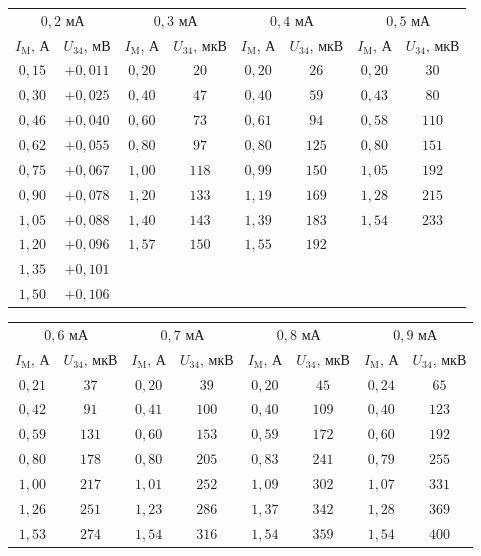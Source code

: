 \begin{center}\small
\begin{tabular}{cccccccc}\hline
\multicolumn{2}{c}{$0{,}2$ мА} & \multicolumn{2}{c}{$0{,}3$ мА} & \multicolumn{2}{c}{$0{,}4$ мА} & \multicolumn{2}{c}{$0{,}5$ мА}\\
$I_{\mathrm M}$, А & $U_{34}$, мВ & $I_{\mathrm M}$, А & $U_{34}$, мкВ & $I_{\mathrm M}$, А & $U_{34}$, мкВ & $I_{\mathrm M}$, А & $U_{34}$, мкВ\\\hline
$0{,}15$ & $+0{,}011$ & $0{,}20$ & $20$ & $0{,}20$ & $26$ & $0{,}20$ & $30$\\
$0{,}30$ & $+0{,}025$ & $0{,}40$ & $47$ & $0{,}40$ & $59$ & $0{,}43$ & $80$\\
$0{,}46$ & $+0{,}040$ & $0{,}60$ & $73$ & $0{,}61$ & $94$ & $0{,}58$ & $110$\\
$0{,}62$ & $+0{,}055$ & $0{,}80$ & $97$ & $0{,}80$ & $125$ & $0{,}80$ & $151$\\
$0{,}75$ & $+0{,}067$ & $1{,}00$ & $118$ & $0{,}99$ & $150$ & $1{,}05$ & $192$\\
$0{,}90$ & $+0{,}078$ & $1{,}20$ & $133$ & $1{,}19$ & $169$ & $1{,}28$ & $215$\\
$1{,}05$ & $+0{,}088$ & $1{,}40$ & $143$ & $1{,}39$ & $183$ & $1{,}54$ & $233$\\
$1{,}20$ & $+0{,}096$ & $1{,}57$ & $150$ & $1{,}55$ & $192$ &  & \\
$1{,}35$ & $+0{,}101$ &  &  &  &  &  & \\
$1{,}50$ & $+0{,}106$ &  &  &  &  &  & \\
\hline\end{tabular}
\end{center}
\begin{center}\small
\begin{tabular}{cccccccc}\hline
\multicolumn{2}{c}{$0{,}6$ мА} & \multicolumn{2}{c}{$0{,}7$ мА} & \multicolumn{2}{c}{$0{,}8$ мА} & \multicolumn{2}{c}{$0{,}9$ мА}\\
$I_{\mathrm M}$, А & $U_{34}$, мкВ & $I_{\mathrm M}$, А & $U_{34}$, мкВ & $I_{\mathrm M}$, А & $U_{34}$, мкВ & $I_{\mathrm M}$, А & $U_{34}$, мкВ\\\hline
$0{,}21$ & $37$ & $0{,}20$ & $39$ & $0{,}20$ & $45$ & $0{,}24$ & $65$\\
$0{,}42$ & $91$ & $0{,}41$ & $100$ & $0{,}40$ & $109$ & $0{,}40$ & $123$\\
$0{,}59$ & $131$ & $0{,}60$ & $153$ & $0{,}59$ & $172$ & $0{,}60$ & $192$\\
$0{,}80$ & $178$ & $0{,}80$ & $205$ & $0{,}83$ & $241$ & $0{,}79$ & $255$\\
$1{,}00$ & $217$ & $1{,}01$ & $252$ & $1{,}09$ & $302$ & $1{,}07$ & $331$\\
$1{,}26$ & $251$ & $1{,}23$ & $286$ & $1{,}37$ & $342$ & $1{,}28$ & $369$\\
$1{,}53$ & $274$ & $1{,}54$ & $316$ & $1{,}54$ & $359$ & $1{,}54$ & $400$\\
\hline\end{tabular}
\end{center}
